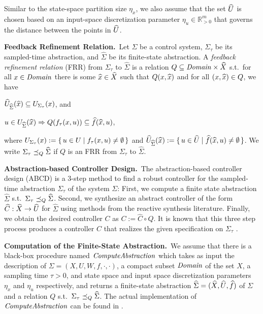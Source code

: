 Similar to the state-space partition size $\eta_x$, we also assume that the set $\widehat{U}$ is chosen based on an input-space discretization parameter $\eta_u\in \mathbb{R}^m_{>0}$ that governs the distance between the points in $\widehat{U}$.

\smallskip
\noindent\textbf{Feedback Refinement Relation.}\
Let $\Sigma$ be a control system, $\Sigma_\tau$ be its sampled-time abstraction, and $\widehat{\Sigma}$ be its finite-state abstraction.
A \emph{feedback refinement relation} (FRR) from $\Sigma_\tau$ to $\widehat{\Sigma}$ 
is a relation $Q\subseteq \mathit{Domain}\times \widehat{X}$ s.t.\ 
for all $x\in \mathit{Domain}$ there is some $\widehat{x}\in \widehat{X}$ such that $Q(x,\widehat{x})$ and
for all $(x,\widehat{x})\in Q$, we have
\begin{inparaenum}[(i)]
 \item $\widehat{U}_{\widehat{\Sigma}}(\widehat{x})\subseteq U_{\Sigma_\tau}(x)$, and 
 \item $u\in U_{\widehat{\Sigma}}(\widehat{x}) \Rightarrow Q(f_\tau(x,u))\subseteq \widehat{f}(\widehat{x},u)$,
\end{inparaenum}
where $U_{\Sigma_\tau}(x):=\set{u\in U \mid f_\tau(x,u)\neq \emptyset}$ and $\widehat{U}_{\widehat{\Sigma}}(\widehat{x}):=\set{u\in \widehat{U}\mid \widehat{f}(\widehat{x},u)\neq \emptyset}$.
We write $\Sigma_\tau \preceq_{Q} \widehat{\Sigma}$ if $Q$ is an FRR from $\Sigma_\tau$ to $\widehat{\Sigma}$.

\smallskip
\noindent\textbf{Abstraction-based Controller Design.}\
The abstraction-based controller design (ABCD) \cite{reissig2016feedback} is a $3$-step method to find a robust controller for the sampled-time abstraction $\Sigma_\tau$ of the system $\Sigma$:
First, we compute a finite state abstraction $\widehat{\Sigma}$ s.t.\ $\Sigma_\tau \preceq_{Q} \widehat{\Sigma}$.
Second, we synthesize an abstract controller of the form $\widehat{C}:\widehat{X}\rightarrow \widehat{U}$ for $\widehat{\Sigma}$ using methods from the reactive synthesis literature.
Finally, we obtain the desired controller $C$ as $C:=\widehat{C}\circ Q$.
It is known that this three step process produces a controller $C$ that realizes the given specification on $\Sigma_\tau$ \cite{reissig2016feedback}.

\smallskip
\noindent\textbf{Computation of the Finite-State Abstraction.}\
We assume that there is a black-box procedure named $\mathit{ComputeAbstraction}$ which takes as input the description of $\Sigma = (X,U,W,f,\cdot,\cdot)$, a compact subset $\mathit{Domain}$ of the set $X$, a sampling time $\tau>0$, and state space and input space discretization parameters $\eta_x$ and $\eta_u$ respectively, and returns a finite-state abstraction $\widehat{\Sigma} = (\widehat{X},\widehat{U},\widehat{f})$ of $\Sigma$ and a relation $Q$ s.t.\ $\Sigma_\tau \preceq_{Q} \widehat{\Sigma}$.
The actual implementation of $\mathit{ComputeAbstraction}$ can be found in \cite{reissig2016feedback}.

